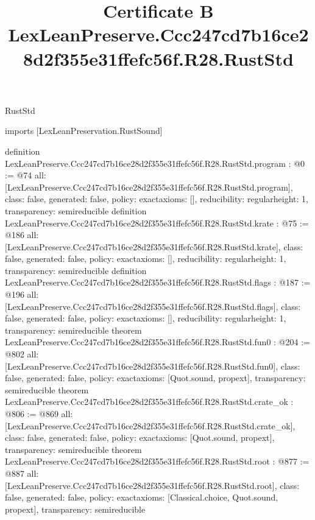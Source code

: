 \begin{lexlean}{RustStd}
\title{Certificate B LexLeanPreserve.Ccc247cd7b16ce28d2f355e31ffefc56f.R28.RustStd}
\begin{coremodule}
imports [LexLeanPreservation.RustSound]

definition LexLeanPreserve.Ccc247cd7b16ce28d2f355e31ffefc56f.R28.RustStd.program : @0 := @74 {
  all: [LexLeanPreserve.Ccc247cd7b16ce28d2f355e31ffefc56f.R28.RustStd.program],
  class: false,
  generated: false,
  policy: exact{axioms: []},
  reducibility: regular{height: 1},
  transparency: semireducible
}
definition LexLeanPreserve.Ccc247cd7b16ce28d2f355e31ffefc56f.R28.RustStd.krate : @75 := @186 {
  all: [LexLeanPreserve.Ccc247cd7b16ce28d2f355e31ffefc56f.R28.RustStd.krate],
  class: false,
  generated: false,
  policy: exact{axioms: []},
  reducibility: regular{height: 1},
  transparency: semireducible
}
definition LexLeanPreserve.Ccc247cd7b16ce28d2f355e31ffefc56f.R28.RustStd.flags : @187 := @196 {
  all: [LexLeanPreserve.Ccc247cd7b16ce28d2f355e31ffefc56f.R28.RustStd.flags],
  class: false,
  generated: false,
  policy: exact{axioms: []},
  reducibility: regular{height: 1},
  transparency: semireducible
}
theorem LexLeanPreserve.Ccc247cd7b16ce28d2f355e31ffefc56f.R28.RustStd.fun0 : @204 := @802 {
  all: [LexLeanPreserve.Ccc247cd7b16ce28d2f355e31ffefc56f.R28.RustStd.fun0],
  class: false,
  generated: false,
  policy: exact{axioms: [Quot.sound, propext]},
  transparency: semireducible
}
theorem LexLeanPreserve.Ccc247cd7b16ce28d2f355e31ffefc56f.R28.RustStd.crate_ok : @806 := @869 {
  all: [LexLeanPreserve.Ccc247cd7b16ce28d2f355e31ffefc56f.R28.RustStd.crate_ok],
  class: false,
  generated: false,
  policy: exact{axioms: [Quot.sound, propext]},
  transparency: semireducible
}
theorem LexLeanPreserve.Ccc247cd7b16ce28d2f355e31ffefc56f.R28.RustStd.root : @877 := @887 {
  all: [LexLeanPreserve.Ccc247cd7b16ce28d2f355e31ffefc56f.R28.RustStd.root],
  class: false,
  generated: false,
  policy: exact{axioms: [Classical.choice, Quot.sound, propext]},
  transparency: semireducible
}


\end{coremodule}
\end{lexlean}
